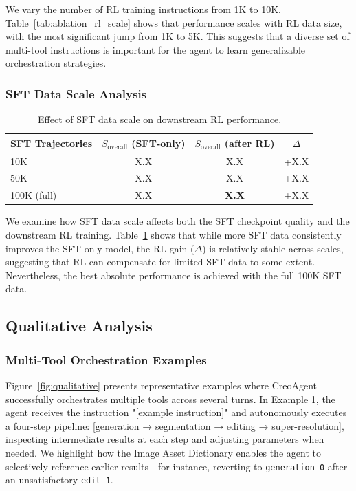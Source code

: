 \documentclass[11pt]{article}
\begin{document}
We vary the number of RL training instructions from 1K to 10K. Table~\ref{tab:ablation_rl_scale} shows that performance scales with RL data size, with the most significant jump from 1K to 5K. This suggests that a diverse set of multi-tool instructions is important for the agent to learn generalizable orchestration strategies.

\subsubsection{SFT Data Scale Analysis}

\begin{table}[t]
\centering
\caption{Effect of SFT data scale on downstream RL performance.}
\label{tab:ablation_sft_scale}
\begin{tabular}{lccc}
\toprule
\textbf{SFT Trajectories} & $S_{\text{overall}}$ (SFT-only) & $S_{\text{overall}}$ (after RL) & $\Delta$ \\
\midrule
10K & X.X & X.X & +X.X \\
50K & X.X & X.X & +X.X \\
100K (full) & X.X & \textbf{X.X} & +X.X \\
\bottomrule
\end{tabular}
\end{table}



We examine how SFT data scale affects both the SFT checkpoint quality and the downstream RL training. Table~\ref{tab:ablation_sft_scale} shows that while more SFT data consistently improves the SFT-only model, the RL gain ($\Delta$) is relatively stable across scales, suggesting that RL can compensate for limited SFT data to some extent. Nevertheless, the best absolute performance is achieved with the full 100K SFT data.

\subsection{Qualitative Analysis}

\subsubsection{Multi-Tool Orchestration Examples}

Figure~\ref{fig:qualitative} presents representative examples where CreoAgent successfully orchestrates multiple tools across several turns. In Example 1, the agent receives the instruction "[example instruction]" and autonomously executes a four-step pipeline: [generation → segmentation → editing → super-resolution], inspecting intermediate results at each step and adjusting parameters when needed. We highlight how the Image Asset Dictionary enables the agent to selectively reference earlier results—for instance, reverting to \texttt{generation\_0} after an unsatisfactory \texttt{edit\_1}.
\end{document}
